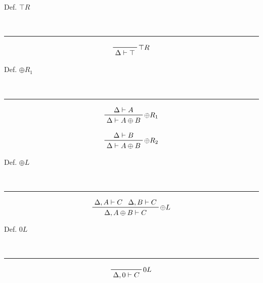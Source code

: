 \begin{note}
  \begin{field}
    Def. $\top R$
  \end{field} \\
  \noindent\rule[0.5ex]{\linewidth}{1pt}
  \begin{field}
    \[
      \prftree[r]
      {$\top R$}
      {\Delta\vdash\top}
    \]
  \end{field}
\end{note}

\begin{note}
  \begin{field}
    Def. $\oplus R_1$
  \end{field} \\
  \noindent\rule[0.5ex]{\linewidth}{1pt}
  \begin{field}
    \[ 
      \prftree[r]
      {$\oplus R_1$}
      {\Delta\vdash A}
      {\Delta\vdash A\oplus B}
    \] 

    \[ 
      \prftree[r]
      {$\oplus R_2$}
      {\Delta\vdash B}
      {\Delta\vdash A\oplus B}
    \] 
  \end{field}
\end{note}


\begin{note}
  \begin{field}
    Def. $\oplus L$
  \end{field} \\
  \noindent\rule[0.5ex]{\linewidth}{1pt}
  \begin{field}
    \[ 
      \prftree[r]
      {$\oplus L$}
      {\Delta, A\vdash C}
      {\Delta, B\vdash C}
      {\Delta, A\oplus B\vdash C}
    \] 
  \end{field}
\end{note}


\begin{note}
  \begin{field}
    Def. $0 L$
  \end{field} \\
  \noindent\rule[0.5ex]{\linewidth}{1pt}
  \begin{field}
    \[
      \prftree[r]
      {$0L$}
      {\Delta, 0\vdash C}
    \]
  \end{field}
\end{note}

